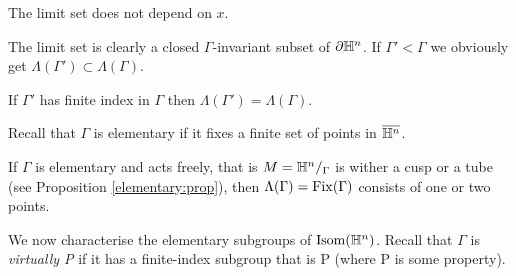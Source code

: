 \begin{ex}
The limit set does not depend on $x$.
\end{ex}

The limit set is clearly a closed $\Gamma$-invariant subset of $\partial \mathbb{H}^n$. If $\Gamma' < \Gamma$ we obviously get $\Lambda(\Gamma')\subset \Lambda(\Gamma)$.

\begin{ex} \label{index:lambda:ex}
If $\Gamma'$ has finite index in $\Gamma$ then $\Lambda(\Gamma') = \Lambda(\Gamma)$.
\end{ex}

Recall that $\Gamma$ is elementary if it fixes a finite set of points in $\overline{\mathbb{H}^n}$.

\begin{example} If $\Gamma$ is elementary and acts freely, that is $M = \mathbb{H}^n/_\Gamma$ is wither a cusp or a tube (see Proposition \ref{elementary:prop}), then $\Lambda(\Gamma) = {\rm Fix}(\Gamma)$ consists of one or two points. 
\end{example}

We now characterise the elementary subgroups of ${\rm Isom}(\mathbb{H}^n)$. Recall that $\Gamma$ is \emph{virtually P} if it has a finite-index subgroup that is P (where P is some property).

